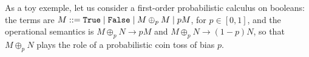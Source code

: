 \begin{comment}
Secondly, the Lipschitz conditions from Section \ref{section4} allow us to reason on program distances in a \emph{compositional} way: suppose, as before, that $M,N:A$ are two programs such that $M$ improves on $N$ by $\epsilon$, and let $\TT C[-]:A \to \B{nat}$ indicate a context; knowing that the interpretation of $\TT C$ is $k$-Lipschitz-continuous on some open set containing both $\model M$ and $\model N$, allows us to immediately deduce that $\TT C[M]$ improves on $\TT C[N]$ by $k \epsilon$. 
Observe that this will typically be the case when the Taylor expansions of $\TT C[M]$ and $\TT C[N]$ actually yields a \emph{finite} sum of at most $k$ terms, i.e.~when 
\begin{align}
\TT C[M] = \sum_{i=0}^{k} \TT D^{(k)}\Big[\lambda x.\TT C[x]\Big]\cdot M^{k}
\end{align}
and similarly for $\TT C[N]$. It is here worth recalling that, for $\STDLC$, a well-known result \cite{difflambda} is that the Taylor expansion of a closed application $MN$ is always \emph{finite}, although its non-zero coefficients may be arbitrarily high. 
Notably, these observations suggest to study tropical versions of \emph{finiteness spaces} \cite{Ehrhard2005}, 
a variant of the relational semantics modeling strongly normalizing programs via \emph{finite} power series.

\end{comment}

As a toy exemple, let us consider a first-order probabilistic calculus on booleans:
the terms are $M::= \mathtt{True} \mid \mathtt{False} \mid M\oplus_p M \mid pM$, for $p\in[0,1]$, and the operational semantics is $M\oplus_p N\to pM$ and $M\oplus_p N \to (1-p)N$, so that $M\oplus_p N$ plays the role of a probabilistic coin toss of bias $p$.

